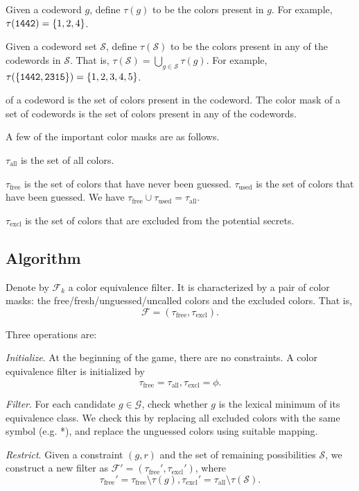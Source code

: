 Given a codeword $g$, define $\tau(g)$ to be the colors present in $g$. For example, $\tau(\texttt{1442}) = \{1, 2, 4\}$. 

Given a codeword set $\mathcal{S}$, define $\tau(\mathcal{S})$ to be the colors present in any of the codewords in $\mathcal{S}$. That is, $\tau(\mathcal{S}) = \bigcup_{g \in \mathcal{S}} \tau(g)$. For example, $\tau(\{\texttt{1442},\texttt{2315} \}) = \{ 1, 2, 3, 4, 5\}$.

of a codeword is the set of colors present in the codeword. The color mask of a set of codewords is the set of colors present in any of the codewords.

A few of the important color masks are as follows.

$\tau_{\text{all}}$ is the set of all colors.

$\tau_{\text{free}}$ is the set of colors that have never been guessed. $\tau_{\text{used}}$ is the set of colors that have been guessed. We have $\tau_{\text{free}} \cup \tau_{\text{used}} = \tau_\text{all}$.

$\tau_{\text{excl}}$ is the set of colors that are excluded from the potential secrets.


\subsection{Algorithm}

\newcommand{\cmall}{\tau_\text{all}}
\newcommand{\cmfree}{\tau_\text{free}}
\newcommand{\cmexcl}{\tau_\text{excl}}

Denote by $\mathcal{F}_k$ a color equivalence filter. It is characterized by a pair of color masks: the free/fresh/unguessed/uncalled colors and the excluded colors. That is,
\[
\mathcal{F} = (\tau_\text{free}, \tau_\text{excl}) .
\]

Three operations are:

\emph{Initialize}. At the beginning of the game, there are no constraints. A color equivalence filter is initialized by
\[
\cmfree = \cmall, \cmexcl = \phi .
\]

\emph{Filter}. For each candidate $g \in \mathcal{G}$, check whether $g$ is the lexical minimum of its equivalence class. We check this by replacing all excluded colors with the same symbol (e.g. *), and replace the unguessed colors using suitable mapping.

\emph{Restrict}. Given a constraint $(g,r)$ and the set of remaining possibilities $\mathcal{S}$, we construct a new filter as $\mathcal{F}' = (\cmfree', \cmexcl')$, where
\[
\cmfree' = \cmfree \setminus \tau(g), \cmexcl' = \cmall \setminus \tau(\mathcal{S})  .
\]


